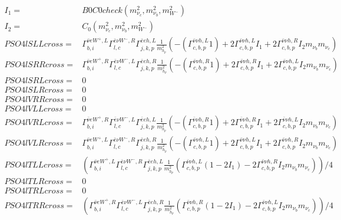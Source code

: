 \documentclass[A4,landscape]{article}
\begin{document}
\begin{align} 
I_1= & B0C0check(m^2_{\nu_{{c}}}, m^2_{\nu_{{b}}}, m^2_{W^-}) \\ 
I_2= & C_0(m^2_{\nu_{{c}}}, m^2_{\nu_{{b}}}, m^2_{W^-}) \\ 
  PSO4lSLLcross= &  \Gamma^{\bar{\nu}e W^+,L}_{b, i} \Gamma^{\bar{e}\nu W^- ,R}_{l, c} \Gamma^{\bar{e}e h ,L}_{j, k, p} \frac{1}{m^2_{h_{{p}}}} (-(\Gamma^{\bar{\nu}\nu h ,L}_{c, b, p} 1) + 2 \Gamma^{\bar{\nu}\nu h ,L}_{c, b, p} I_1 + 2 \Gamma^{\bar{\nu}\nu h ,R}_{c, b, p} I_2 m_{\nu_{{b}}} m_{\nu_{{c}}}) \\ 
  PSO4lSRRcross= &  \Gamma^{\bar{\nu}e W^+,R}_{b, i} \Gamma^{\bar{e}\nu W^- ,L}_{l, c} \Gamma^{\bar{e}e h ,R}_{j, k, p} \frac{1}{m^2_{h_{{p}}}} (-(\Gamma^{\bar{\nu}\nu h ,R}_{c, b, p} 1) + 2 \Gamma^{\bar{\nu}\nu h ,R}_{c, b, p} I_1 + 2 \Gamma^{\bar{\nu}\nu h ,L}_{c, b, p} I_2 m_{\nu_{{b}}} m_{\nu_{{c}}}) \\ 
  PSO4lSRLcross= & 0 \\ 
  PSO4lSLRcross= & 0 \\ 
  PSO4lVRRcross= & 0 \\ 
  PSO4lVLLcross= & 0 \\ 
  PSO4lVRLcross= &  \Gamma^{\bar{\nu}e W^+,R}_{b, i} \Gamma^{\bar{e}\nu W^- ,L}_{l, c} \Gamma^{\bar{e}e h ,L}_{j, k, p} \frac{1}{m^2_{h_{{p}}}} (-(\Gamma^{\bar{\nu}\nu h ,R}_{c, b, p} 1) + 2 \Gamma^{\bar{\nu}\nu h ,R}_{c, b, p} I_1 + 2 \Gamma^{\bar{\nu}\nu h ,L}_{c, b, p} I_2 m_{\nu_{{b}}} m_{\nu_{{c}}}) \\ 
  PSO4lVLRcross= &  \Gamma^{\bar{\nu}e W^+,L}_{b, i} \Gamma^{\bar{e}\nu W^- ,R}_{l, c} \Gamma^{\bar{e}e h ,R}_{j, k, p} \frac{1}{m^2_{h_{{p}}}} (-(\Gamma^{\bar{\nu}\nu h ,L}_{c, b, p} 1) + 2 \Gamma^{\bar{\nu}\nu h ,L}_{c, b, p} I_1 + 2 \Gamma^{\bar{\nu}\nu h ,R}_{c, b, p} I_2 m_{\nu_{{b}}} m_{\nu_{{c}}}) \\ 
  PSO4lTLLcross= & ( \Gamma^{\bar{\nu}e W^+,L}_{b, i} \Gamma^{\bar{e}\nu W^- ,R}_{l, c} \Gamma^{\bar{e}e h ,L}_{j, k, p} \frac{1}{m^2_{h_{{p}}}} (\Gamma^{\bar{\nu}\nu h ,L}_{c, b, p} (1 - 2 I_1) - 2 \Gamma^{\bar{\nu}\nu h ,R}_{c, b, p} I_2 m_{\nu_{{b}}} m_{\nu_{{c}}}))/4 \\ 
  PSO4lTLRcross= & 0 \\ 
  PSO4lTRLcross= & 0 \\ 
  PSO4lTRRcross= & ( \Gamma^{\bar{\nu}e W^+,R}_{b, i} \Gamma^{\bar{e}\nu W^- ,L}_{l, c} \Gamma^{\bar{e}e h ,R}_{j, k, p} \frac{1}{m^2_{h_{{p}}}} (\Gamma^{\bar{\nu}\nu h ,R}_{c, b, p} (1 - 2 I_1) - 2 \Gamma^{\bar{\nu}\nu h ,L}_{c, b, p} I_2 m_{\nu_{{b}}} m_{\nu_{{c}}}))/4 \\ 
\end{align} 
\end{document}
